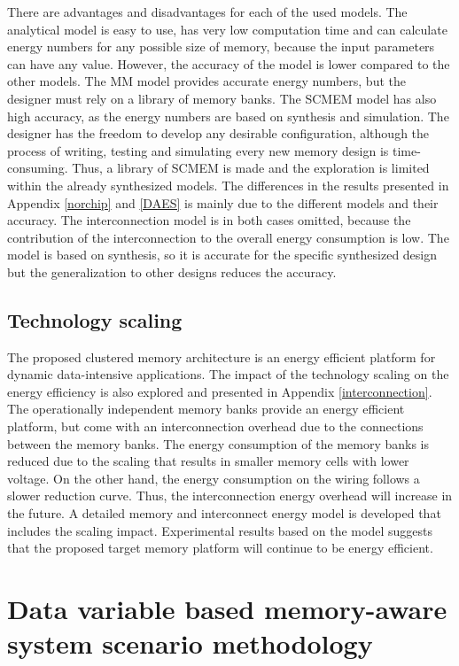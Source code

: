 There are advantages and disadvantages for each of the used models.
The analytical model is easy to use, has very low computation time and can calculate energy numbers for any possible size of memory, because the input parameters can have any value.
However, the accuracy of the model is lower compared to the other models.
The MM model provides accurate energy numbers, but the designer must rely on a library of memory banks.
The SCMEM model has also high accuracy, as the energy numbers are based on synthesis and simulation.
The designer has the freedom to develop any desirable configuration, although the process of writing, testing and simulating every new memory design is time-consuming.
Thus, a library of SCMEM is made and the exploration is limited within the already synthesized models.
The differences in the results presented in Appendix \ref{norchip} and \ref{DAES} is mainly due to the different models and their accuracy. 
The interconnection model is in both cases omitted, because the contribution of the interconnection to the overall energy consumption is low.
The model is based on synthesis, so it is accurate for the specific synthesized design but the generalization to other designs reduces the accuracy. 

\subsection{Technology scaling}

The proposed clustered memory architecture is an energy efficient platform for dynamic data-intensive applications.
The impact of the technology scaling on the energy efficiency is also explored and presented in Appendix \ref{interconnection}. 
The operationally independent memory banks provide an energy efficient platform, but come with an interconnection overhead due to the connections between the memory banks. 
The energy consumption of the memory banks is reduced due to the scaling that results in smaller memory cells with lower voltage.
On the other hand, the energy consumption on the wiring follows a slower reduction curve.
Thus, the interconnection energy overhead will increase in the future.
A detailed memory and interconnect energy model is developed that includes the scaling impact.
Experimental results based on the model suggests that the proposed target memory platform will continue to be energy efficient.

\section{Data variable based memory-aware system scenario methodology}

